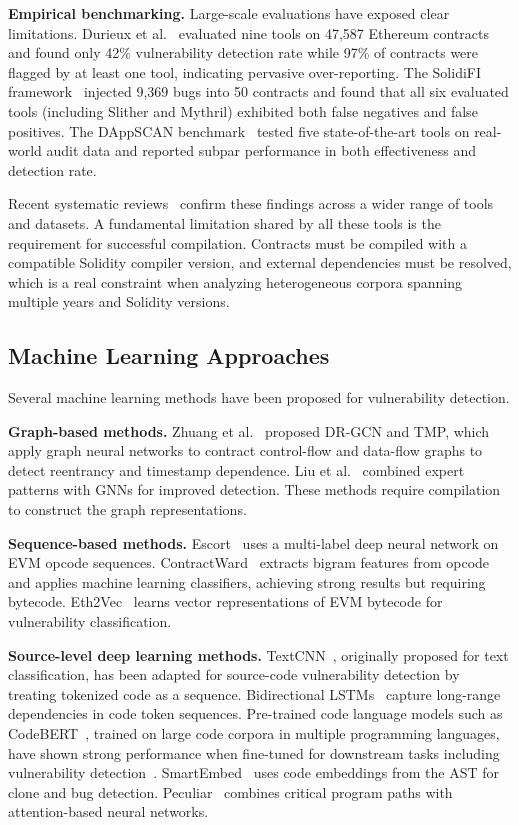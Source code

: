 \documentclass[11pt,a4paper]{article}
\begin{document}
\textbf{Empirical benchmarking.}
Large-scale evaluations have exposed clear limitations.
Durieux et al.~\cite{durieux2020empirical} evaluated nine tools on 47,587 Ethereum contracts and found only 42\% vulnerability detection rate while 97\% of contracts were flagged by at least one tool, indicating pervasive over-reporting.
The SolidiFI framework~\cite{ghaleb2020effective} injected 9,369 bugs into 50 contracts and found that all six evaluated tools (including Slither and Mythril) exhibited both false negatives and false positives.
The DAppSCAN benchmark~\cite{wu2023dappscan} tested five state-of-the-art tools on real-world audit data and reported subpar performance in both effectiveness and detection rate.

Recent systematic reviews~\cite{rameder2022review,kushwaha2022systematic,zhang2023survey} confirm these findings across a wider range of tools and datasets.
A fundamental limitation shared by all these tools is the requirement for successful compilation.
Contracts must be compiled with a compatible Solidity compiler version, and external dependencies must be resolved, which is a real constraint when analyzing heterogeneous corpora spanning multiple years and Solidity versions.

\subsection{Machine Learning Approaches}

Several machine learning methods have been proposed for vulnerability detection.

\textbf{Graph-based methods.}
Zhuang et al.~\cite{zhuang2020smart} proposed DR-GCN and TMP, which apply graph neural networks to contract control-flow and data-flow graphs to detect reentrancy and timestamp dependence.
Liu et al.~\cite{liu2021combining} combined expert patterns with GNNs for improved detection.
These methods require compilation to construct the graph representations.

\textbf{Sequence-based methods.}
Escort~\cite{lutz2021escort} uses a multi-label deep neural network on EVM opcode sequences.
ContractWard~\cite{wang2020contractward} extracts bigram features from opcode and applies machine learning classifiers, achieving strong results but requiring bytecode.
Eth2Vec~\cite{ashizawa2021eth2vec} learns vector representations of EVM bytecode for vulnerability classification.

\textbf{Source-level deep learning methods.}
TextCNN~\cite{kim2014convolutional}, originally proposed for text classification, has been adapted for source-code vulnerability detection by treating tokenized code as a sequence.
Bidirectional LSTMs~\cite{schuster1997bidirectional} capture long-range dependencies in code token sequences.
Pre-trained code language models such as CodeBERT~\cite{feng2020codebert}, trained on large code corpora in multiple programming languages, have shown strong performance when fine-tuned for downstream tasks including vulnerability detection~\cite{fu2022linevul}.
SmartEmbed~\cite{gao2020smartembed} uses code embeddings from the AST for clone and bug detection.
Peculiar~\cite{wu2021peculiar} combines critical program paths with attention-based neural networks.
\end{document}
